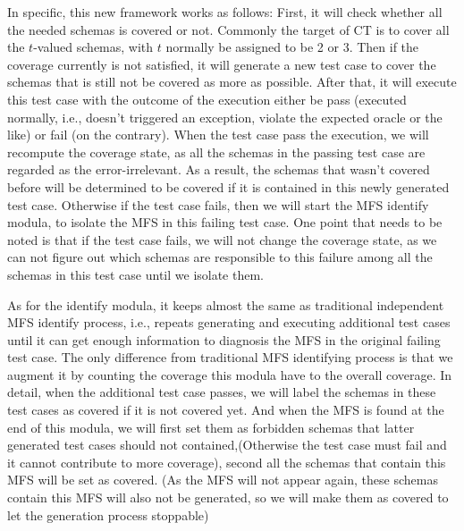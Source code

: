 \documentclass{sig-alternate}
\begin{document}
In specific, this new framework works as follows: First, it will check whether all the needed schemas is covered or not. Commonly the target of CT is to cover all the $t$-valued schemas, with $t$ normally be assigned to be 2 or 3. Then if the coverage currently is not satisfied, it will generate a new test case to cover the schemas that is still not be covered as more as possible. After that, it will execute this test case with the outcome of the execution either be pass (executed normally, i.e., doesn't triggered an exception, violate the expected oracle or the like) or fail (on the contrary). When the test case pass the execution, we will recompute the coverage state, as all the schemas in the passing test case are regarded as the error-irrelevant. As a result, the schemas that wasn't covered before will be determined to be covered if it is contained in this newly generated test case. Otherwise if the test case fails, then we will start the MFS identify modula, to isolate the MFS in this failing test case. One point that needs to be noted is that if the test case fails, we will not change the coverage state, as we can not figure out which schemas are responsible to this failure among all the schemas in this test case until we isolate them.

As for the identify modula, it keeps almost the same as traditional independent MFS identify process, i.e., repeats generating and executing additional test cases until it can get enough information to diagnosis the MFS in the original failing test case. The only difference from traditional MFS identifying process is that we augment it by counting the coverage this modula have to the overall coverage. In detail, when the additional test case passes, we will label the schemas in these test cases as covered if it is not covered yet. And when the MFS is found at the end of this modula, we will first set them as forbidden schemas that latter generated test cases should not contained,(Otherwise the test case must fail and it cannot contribute to more coverage), second all the schemas that contain this MFS will be set as covered. (As the MFS will not appear again, these schemas contain this MFS will also not be generated, so we will make them as covered to let the generation process stoppable)
%
\end{document}
